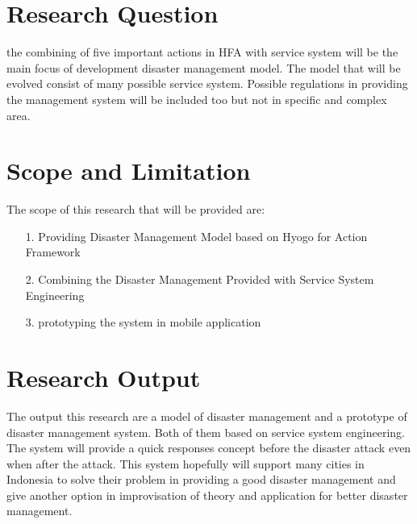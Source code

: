 \section{Research Question}
the combining of five important actions in HFA with service system will be the main focus of development disaster management model. The model that will be evolved consist of many possible service system. Possible regulations in providing the management system will be included too but not in specific and complex area.\par

\section{Scope and Limitation}
The scope of this research that will be provided are:
\begin{enumerate}
\setlength{\itemsep}{1.5pt}
\setlength{\parskip}{1.5pt}
\item[1.] Providing Disaster Management Model based on Hyogo for Action Framework
\item[2.] Combining the Disaster Management Provided with Service System Engineering
\item[3.] prototyping the system in mobile application\par
\end{enumerate}

\section{Research Output}
The output this research are a model of disaster management and a prototype of disaster management system. Both of them based on service system engineering. The system will provide a quick responses concept before the disaster attack even when after the attack. This system hopefully will support many cities in Indonesia to solve their problem in providing a good disaster management and give another option in improvisation of theory and application for better disaster management.


